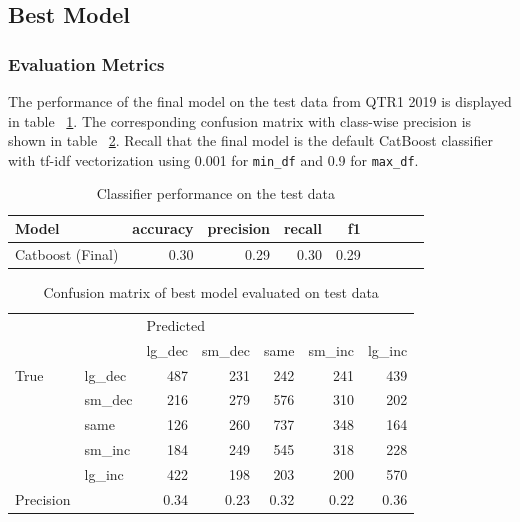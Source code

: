 \documentclass{article}
\begin{document}
	\subsection{Best Model}
	
	\subsubsection{Evaluation Metrics}

	The performance of the final model on the test data from QTR1 2019 is displayed in table ~\ref{table:results_test}. The corresponding confusion matrix with class-wise precision is shown in table ~\ref{table:best_model_cm_abs}. Recall that the final model is the default CatBoost classifier with tf-idf vectorization using 0.001 for \lstinline{min_df} and 0.9 for \lstinline{max_df}.

	\begin{table}[h!]
	\centering
	\caption{Classifier performance on the test data}
	\label{table:results_test}
	
	\begin{tabular}{lrrrrrrrr}
		\toprule
		Model &     accuracy &     precision &     recall &    f1 \\
		\midrule
		Catboost (Final)   &  0.30 &  0.29 &   0.30 &  0.29 \\
		\bottomrule
	\end{tabular}
	
	\end{table}%


	\begin{table}[h!]
	\centering
	\caption{Confusion matrix of best model evaluated on test data}
	\label{table:best_model_cm_abs}
	
	\begin{tabular}{llrrrrr}
		\toprule
		&        & \multicolumn{5}{l}{Predicted} \\
		&        &    lg\_dec & sm\_dec & same & sm\_inc & lg\_inc \\
		\midrule
		True & lg\_dec &  487 &    231 &  242 &    241 &    439 \\
		& sm\_dec &       216 &    279 &  576 &    310 &    202 \\
		& same &          126 &    260 &  737 &    348 &    164 \\
		& sm\_inc &       184 &    249 &  545 &    318 &    228 \\
		& lg\_inc &       422 &    198 &  203 &    200 &    570 \\
		\bottomrule
		Precision &  &    0.34 &  0.23 &  0.32 &   0.22 &    0.36 \\
		\bottomrule
	\end{tabular}
	
	\end{table}%
\end{document}
